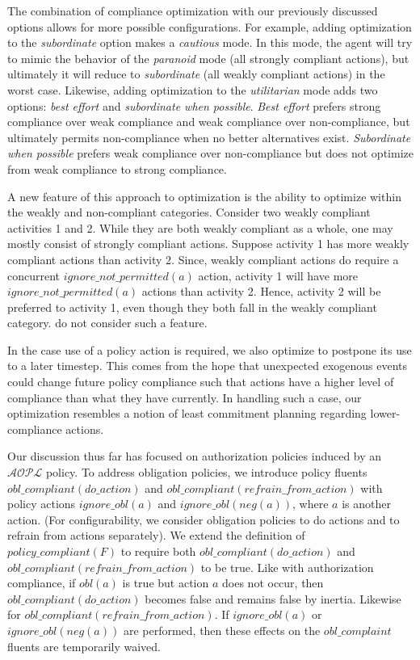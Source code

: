 The combination of compliance optimization with our previously discussed options allows for more possible configurations.
For example, adding optimization to the \textit{subordinate} option makes a \textit{cautious} mode.
In this mode, the agent will try to mimic the behavior of the \textit{paranoid} mode (all strongly compliant actions), but ultimately it will reduce to \textit{subordinate} (all weakly compliant actions) in the worst case.
Likewise, adding optimization to the \textit{utilitarian} mode adds two options: \textit{best effort} and \textit{subordinate when possible}.
\textit{Best effort} prefers strong compliance over weak compliance and weak compliance over non-compliance, but ultimately permits non-compliance when no better alternatives exist.
\textit{Subordinate when possible} prefers weak compliance over non-compliance but does not optimize from weak compliance to strong compliance.

A new feature of this approach to optimization is the ability to optimize within the weakly and non-compliant categories.
Consider two weakly compliant activities 1 and 2.
While they are both weakly compliant as a whole, one may mostly consist of strongly compliant actions.
Suppose activity 1 has more weakly compliant actions than activity 2.
Since, weakly compliant actions do require a concurrent $ignore\_not\_permitted(a)$ action, activity 1 will have more $ignore\_not\_permitted(a)$ actions than activity 2.
Hence, activity 2 will be preferred to activity 1, even though they both fall in the weakly compliant category.
\citet{gelfond_authorization_2008} do not consider such a feature.

In the case use of a policy action is required, we also optimize to postpone its use to a later timestep.
This comes from the hope that unexpected exogenous events could change future policy compliance such that actions have a higher level of compliance than what they have currently.
In handling such a case, our optimization resembles a notion of least commitment planning regarding lower-compliance actions.

Our discussion thus far has focused on authorization policies induced by an $\mathcal{AOPL}$ policy.
To address obligation policies, we introduce policy fluents $obl\_compliant(do\_action)$ and $obl\_compliant(refrain\_from\_action)$ with policy actions $ignore\_obl(a)$ and $ignore\_obl(neg(a))$, where $a$ is another action.
(For configurability, we consider obligation policies to do actions and to refrain from actions separately).
We extend the definition of $policy\_compliant(F)$ to require both $obl\_compliant(do\_action)$ and $obl\_compliant(refrain\_from\_action)$ to be true.
Like with authorization compliance, if $obl(a)$ is true but action $a$ does not occur, then $obl\_compliant(do\_action)$ becomes false and remains false by inertia.
Likewise for $obl\_compliant(refrain\_from\_action)$.
If $ignore\_obl(a)$ or $ignore\_obl(neg(a))$ are performed, then these effects on the $obl\_complaint$ fluents are temporarily waived.

